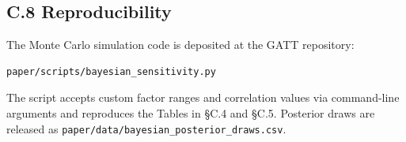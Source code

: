 \documentclass[11pt,a4paper]{article}
\begin{document}
\subsection{C.8 Reproducibility}

The Monte Carlo simulation code is deposited at the GATT repository:
\begin{verbatim}
paper/scripts/bayesian_sensitivity.py
\end{verbatim}

The script accepts custom factor ranges and correlation values via command-line arguments and reproduces the Tables in §C.4 and §C.5. Posterior draws are released as \texttt{paper/data/bayesian\_posterior\_draws.csv}.





\end{document}
